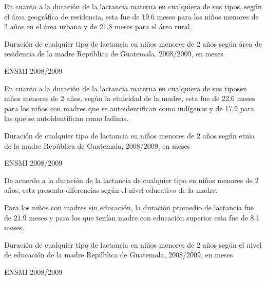
%
{%
En cuanto a la duración de la lactancia materna en cualquiera de sus tipos\llamada, según el área geográfica de residencia, esta fue de 19.6 meses para los niños menores de 2 años en el área urbana y de 21.8 meses para el área rural.

}%
{%
	Duración de cualquier tipo de lactancia en niños menores de 2 años según área de residencia de la madre} %
{%
	República de Guatemala, 2008/2009, en meses} %
{%
	\begin{tikzpicture}[x=1pt,y=1pt]    \end{tikzpicture}
}%
{%
	ENSMI 2008/2009} %



%
{%
En cuanto a la duración de la lactancia materna en cualquiera de sus tipos\llamada en niños menores de 2 años, según la etnicidad de la madre, esta fue de 22.6 meses para los niños con madres que se autoidentifican como indígenas y de 17.9 para las que se autoidentifican como ladinas.

}%
{%
	Duración de cualquier tipo de lactancia en niños menores de 2 años según etnia de la madre} %
{%
	República de Guatemala, 2008/2009, en meses} %
{%
	\begin{tikzpicture}[x=1pt,y=1pt]    \end{tikzpicture}
}%
{%
	ENSMI 2008/2009} %


%
{%
De acuerdo a la duración de la lactancia de cualquier tipo en niños menores de 2 años, esta presenta diferencias según el nivel educativo de la madre.

Para los niños con madres sin educación, la duración promedio de lactancia fue de 21.9 meses y para los que tenían madre con educación superior esta fue de 8.1 meses.}%
{%
	Duración de cualquier tipo de lactancia en niños menores de 2 años según el nivel de educación de la madre} %
{%
	República de Guatemala, 2008/2009, en meses} %
{%
	\begin{tikzpicture}[x=1pt,y=1pt]    \end{tikzpicture}
}%
{%
	ENSMI 2008/2009} %


